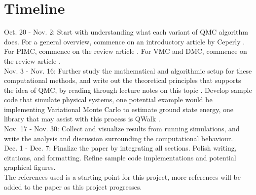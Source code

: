 \documentclass[11pt]{article}
\begin{document}
\section{Timeline}
Oct. 20 - Nov. 2: Start with understanding what each variant of QMC algorithm does. For a general overview, commence on an introductory article by Ceperly \cite{ceperly_10}. For PIMC, commence on the review article \cite{troyer_wiese_05}. For VMC and DMC, commence on the review article \cite{foulkes_mitas_needs_rajagopal_01}. \\
Nov. 3 - Nov. 16: Further study the mathematical and algorithmic setup for these computational methods, and write out the theoretical principles that supports the idea of QMC, by reading through lecture notes on this topic \cite{troyer_11}. Develop sample code that simulate physical systems, one potential example would be implementing Variational Monte Carlo to estimate ground state energy, one library that may assist with this process is QWalk \cite{wagner_bajdich_mitas_09}. \\
Nov. 17 - Nov. 30: Collect and visualize results from running simulations, and write the analysis and discussion surrounding the computational behaviour. \\
Dec. 1 - Dec. 7: Finalize the paper by integrating all sections. Polish writing, citations, and formatting. Refine sample code implementations and potential graphical figures. \\
The references used is a starting point for this project, more references will be added to the paper as this project progresses.





\end{document}
